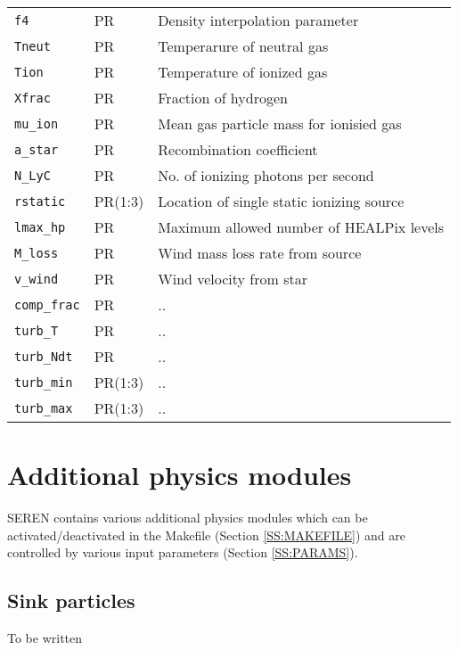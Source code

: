 \documentclass[a4paper]{article}
\newcommand{\var}[1]{\texttt{#1}}
\begin{document}
\begin{center}
\begin{supertabular}{|p{3cm}|p{2cm}|p{8cm}|}
\var{f4}             & PR       & Density interpolation parameter \\
\var{Tneut}          & PR       & Temperarure of neutral gas \\
\var{Tion}           & PR       & Temperature of ionized gas \\
\var{Xfrac}          & PR       & Fraction of hydrogen \\
\var{mu\_ion}        & PR       & Mean gas particle mass for ionisied gas \\
\var{a\_star}        & PR       & Recombination coefficient \\
\var{N\_LyC}         & PR       & No. of ionizing photons per second \\
\var{rstatic}        & PR(1:3)  & Location of single static ionizing source \\
\var{lmax\_hp}       & PR       & Maximum allowed number of HEALPix levels \\
\var{M\_loss}        & PR       & Wind mass loss rate from source \\
\var{v\_wind}        & PR       & Wind velocity from star \\ \hline
\var{comp\_frac}     & PR       & .. \\
\var{turb\_T}        & PR       & .. \\
\var{turb\_Ndt}      & PR       & .. \\
\var{turb\_min}      & PR(1:3)  & .. \\
\var{turb\_max}      & PR(1:3)  & .. \\ \hline
\end{supertabular}
\end{center}
\vspace{1cm}


\newpage


\section{Additional physics modules} \label{SS:PHYSICS}
SEREN contains various additional physics modules which can be activated/deactivated in the Makefile (Section \ref{SS:MAKEFILE}) and are controlled by various input parameters (Section \ref{SS:PARAMS}).


\subsection{Sink particles}
To be written
\end{document}
